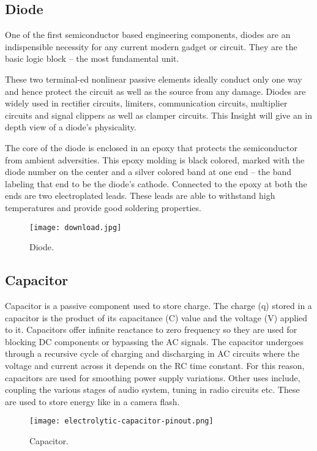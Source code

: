 \subsection{Diode}
One of the first semiconductor based engineering components, diodes are an indispensible necessity for any current modern gadget or circuit. They are the basic logic block – the most fundamental unit.\vspace{.3cm}

These two terminal-ed nonlinear passive elements ideally conduct only one way and hence protect the circuit as well as the source from any damage. Diodes are widely used in rectifier circuits, limiters, communication circuits, multiplier circuits and signal clippers as well as clamper circuits. This Insight will give an in depth view of a diode’s physicality.

The core of the diode is enclosed in an epoxy that protects the semiconductor from ambient adversities. This epoxy molding is black colored, marked with the diode number on the center and a silver colored band at one end – the band labeling that end to be the diode’s cathode. Connected to the epoxy at both the ends are two electroplated leads. These leads are able to withstand high temperatures and provide good soldering properties.
\begin{figure}[h]
	\centering
	\texttt{[image: download.jpg]}
	\caption{Diode.}
	
	
\end{figure}
\subsection{Capacitor}
Capacitor is a passive component used to store charge. The charge (q) stored in a capacitor is the product of its capacitance (C) value and the voltage (V) applied to it. Capacitors offer infinite reactance to zero frequency so they are used for blocking DC components or bypassing the AC signals. The capacitor undergoes through a recursive cycle of charging and discharging in AC circuits where the voltage and current across it depends on the RC time constant. For this reason, capacitors are used for smoothing power supply variations. Other uses include, coupling the various stages of audio system, tuning in radio circuits etc. These are used to store energy like in a camera flash.

\begin{figure}[h]
	\centering
	\texttt{[image: electrolytic-capacitor-pinout.png]}
	\caption{Capacitor.}
\end{figure}


